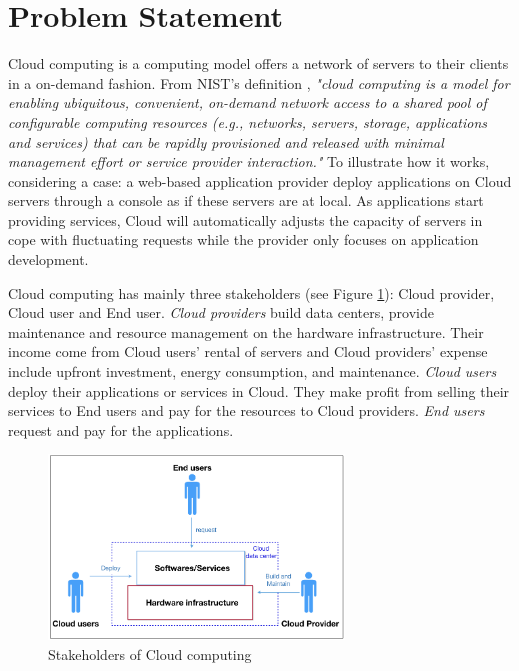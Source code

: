 \section{Problem Statement}

Cloud computing is a computing model offers a network of servers to their 
clients in a on-demand fashion. From NIST's definition \cite{Mell:2011jj}, \textit{"cloud computing is a model for enabling ubiquitous, convenient, on-demand network access to a shared pool of configurable computing resources (e.g., networks, servers, storage, applications and services) that can be rapidly provisioned and released with minimal management effort or service provider interaction."} 
To illustrate how it works, considering a case: a web-based application provider deploy applications on Cloud servers through a console as if these servers are at local. As applications start providing services, Cloud will automatically adjusts the capacity of servers in cope with fluctuating requests while the provider only focuses on application development. 


Cloud computing has mainly three stakeholders \cite{Jennings:2015ht} (see Figure \ref{fig:stakeholders}): Cloud provider, Cloud user and End user. \emph{Cloud providers} build data centers, provide maintenance and resource management on the hardware infrastructure. Their income come from Cloud users' rental of servers and Cloud providers' expense include upfront investment, energy consumption, and maintenance. \emph{Cloud users} deploy their applications or services in Cloud. They make profit from selling their services to End users and pay for the resources to Cloud providers.
 \emph{End users} request and pay for the applications.
\begin{figure}[H]
	\centering
	\includegraphics[width=0.7\textwidth]{pics/stakeholders.png}
	\caption{Stakeholders of Cloud computing}
	\label{fig:stakeholders}
\end{figure}

